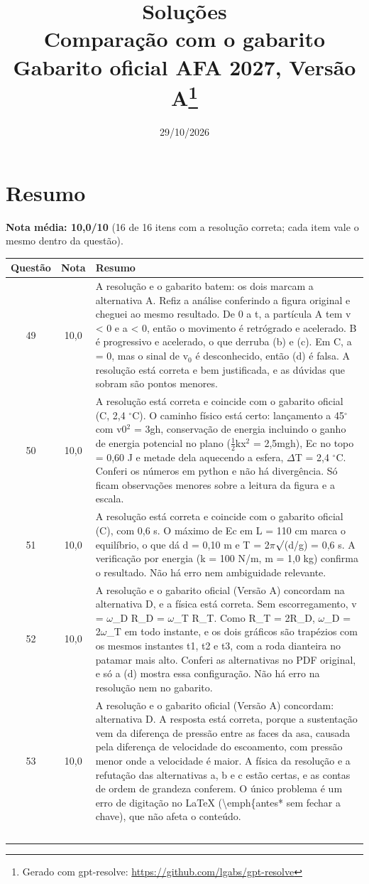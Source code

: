 \documentclass{article}%
\title{Soluções\\[4pt]\large Comparação com o gabarito Gabarito oficial AFA 2027, Versão A\thanks{Gerado com gpt-resolve: \url{https://github.com/lgabs/gpt-resolve}}}%
\date{29/10/2026}%
\begin{document}
%
\normalsize%
\maketitle%
\section*{Resumo}\textbf{Nota média: 10,0/10} (16 de 16 itens com a resolução correta; cada item vale o mesmo dentro da questão).\par\medskip%
\begin{longtable}{@{}c c p{}@{}}\toprule Questão & Nota & Resumo \\ \midrule
49 & 10,0 & A resolução e o gabarito batem: os dois marcam a alternativa A. Refiz a análise conferindo a figura original e cheguei ao mesmo resultado. De 0 a t, a partícula A tem v < 0 e a < 0, então o movimento é retrógrado e acelerado. B é progressivo e acelerado, o que derruba (b) e (c). Em C, a = 0, mas o sinal de v$_{0}$ é desconhecido, então (d) é falsa. A resolução está correta e bem justificada, e as dúvidas que sobram são pontos menores. \\
50 & 10,0 & A resolução está correta e coincide com o gabarito oficial (C, 2,4 $^\circ$C). O caminho físico está certo: lançamento a 45$^\circ$ com v0$^2$ = 3gh, conservação de energia incluindo o ganho de energia potencial no plano ($\frac12$kx$^2$ = 2,5mgh), Ec no topo = 0,60 J e metade dela aquecendo a esfera, $\Delta$T = 2,4 $^\circ$C. Conferi os números em python e não há divergência. Só ficam observações menores sobre a leitura da figura e a escala. \\
51 & 10,0 & A resolução está correta e coincide com o gabarito oficial (C), com 0,6 s. O máximo de Ec em L = 110 cm marca o equilíbrio, o que dá d = 0,10 m e T = 2$\pi$$\surd$(d/g) = 0,6 s. A verificação por energia (k = 100 N/m, m = 1,0 kg) confirma o resultado. Não há erro nem ambiguidade relevante. \\
52 & 10,0 & A resolução e o gabarito oficial (Versão A) concordam na alternativa D, e a física está correta. Sem escorregamento, v = $\omega$\_D R\_D = $\omega$\_T R\_T. Como R\_T = 2R\_D, $\omega$\_D = 2$\omega$\_T em todo instante, e os dois gráficos são trapézios com os mesmos instantes t1, t2 e t3, com a roda dianteira no patamar mais alto. Conferi as alternativas no PDF original, e só a (d) mostra essa configuração. Não há erro na resolução nem no gabarito. \\
53 & 10,0 & A resolução e o gabarito oficial (Versão A) concordam: alternativa D. A resposta está correta, porque a sustentação vem da diferença de pressão entre as faces da asa, causada pela diferença de velocidade do escoamento, com pressão menor onde a velocidade é maior. A física da resolução e a refutação das alternativas a, b e c estão certas, e as contas de ordem de grandeza conferem. O único problema é um erro de digitação no LaTeX (\textbackslash{}emph\{antes* sem fechar a chave), que não afeta o conteúdo. \\
$$
\end{longtable}
\end{document}
